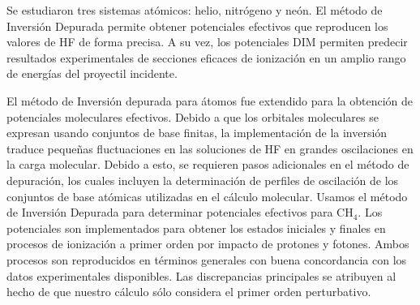 Se estudiaron tres sistemas atómicos: helio, nitrógeno y neón. El método 
de Inversión Depurada permite obtener potenciales efectivos que 
reproducen los valores de HF de forma precisa. A su vez, los potenciales
DIM permiten predecir resultados experimentales de secciones eficaces
de ionización en un amplio rango de energías del proyectil incidente.

El método de Inversión depurada para átomos fue extendido para la 
obtención de potenciales moleculares efectivos. Debido a que los 
orbitales moleculares se expresan usando conjuntos de base finitas, 
la implementación de la inversión traduce pequeñas fluctuaciones en las
soluciones de HF en grandes oscilaciones en la carga molecular.
Debido a esto, se requieren pasos adicionales en el método de depuración,
los cuales incluyen la determinación de perfiles de oscilación de los
conjuntos de base atómicas utilizadas en el cálculo molecular.
Usamos el método de Inversión Depurada para determinar potenciales
efectivos para CH$_4$. Los potenciales son implementados para obtener
los estados iniciales y finales en procesos de ionización a primer orden
por impacto de protones y fotones. Ambos procesos son reproducidos en 
términos generales con buena concordancia con los datos experimentales 
disponibles. Las discrepancias principales se atribuyen al hecho de 
que nuestro cálculo sólo considera el primer orden perturbativo.




